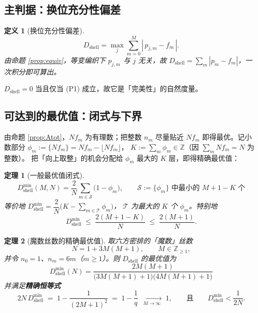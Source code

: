 \documentclass[12pt, a4paper]{ctexart}
\newtheorem{definition}{定义}[section]
\newtheorem{theorem}{定理}[section]
\begin{document}
\subsection{主判据：换位充分性偏差}

\begin{definition}[换位充分性偏差]
\begin{equation}
D_{\mathrm{shell}}
= \max_{j} \sum_{m=0}^{M}
\left|\, p_{j,m} - f_m \,\right| .
\label{eq:Dshell}
\end{equation}
由命题 \ref{prop:equiv}，等变编织下 $p_{j,m}$ 与 $j$ 无关，故
$D_{\mathrm{shell}} = \sum_m |p_m - f_m|$，一次积分即可算出。
\end{definition}

$D_{\mathrm{shell}}=0$ 当且仅当 (P1) 成立，故它是「完美性」的自然度量。

\subsection{可达到的最优值：闭式与下界}

由命题 \ref{prop:Atot}，$N f_m$ 为有理数；把整数 $n_m$ 尽量贴近 $N f_m$
即得最优。记小数部分 $\phi_m := \{N f_m\} = N f_m - \lfloor N f_m\rfloor$，
$K := \sum_m \phi_m \in \mathbb{Z}$（因 $\sum_m Nf_m = N$ 为整数）。
把「向上取整」的机会分配给 $\phi_m$ 最大的 $K$ 层，即得精确最优值：

\begin{theorem}[一般最优值闭式]
\label{thm:general}
\begin{equation}
\boxed{\;
D_{\mathrm{shell}}^{\min}(M,N)
= \frac{2}{N}\sum_{m\in \mathcal{S}}\big(1-\phi_m\big),
\qquad
\mathcal{S} := \text{$\{\phi_m\}$ 中最小的 $M+1-K$ 个}
\;}
\label{eq:general}
\end{equation}
等价地 $D_{\mathrm{shell}}^{\min} = \dfrac{2}{N}\Big(K-\sum_{m\in\mathcal{T}}\phi_m\Big)$，
$\mathcal{T}$ 为最大的 $K$ 个 $\phi_m$。特别地
\begin{equation}
D_{\mathrm{shell}}^{\min} \;\le\; \frac{2(M+1-K)}{N} \;\le\; \frac{2(M+1)}{N}.
\end{equation}
\end{theorem}

\begin{theorem}[魔数丝数的精确最优值]
\label{thm:closedform}
取六方密排的「魔数」丝数
\begin{equation}
N = 1 + 3M(M+1),\qquad M\in\mathbb{Z}_{\ge1},
\end{equation}
并令 $n_0=1$、$n_m=6m$（$m\ge1$）。则 $D_{\mathrm{shell}}$ 的最优值为
\begin{equation}
\boxed{\;
D_{\mathrm{shell}}^{\min}(N)
= \frac{2M(M+1)}{\big(3M(M+1)+1\big)\big(4M(M+1)+1\big)}
\;}
\label{eq:closedform}
\end{equation}
并满足\textbf{精确恒等式}
\begin{equation}
2N\,D_{\mathrm{shell}}^{\min} \;=\; 1-\frac{1}{(2M+1)^2} \;=\; 1-\frac{1}{q}
\;\xrightarrow[\ M\to\infty\ ]{}\; 1 ,
\qquad\text{且}\qquad
D_{\mathrm{shell}}^{\min} < \frac{1}{2N}.
\label{eq:identity}
\end{equation}
\end{theorem}
\end{document}
